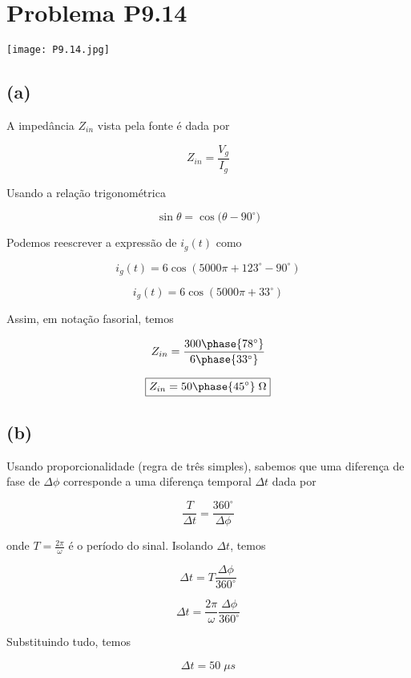 
\section*{Problema P9.14}

\renewcommand*\thesection{9.14}

\begin{center}
    \texttt{[image: P9.14.jpg]}
\end{center}

\subsection*{(a)}

A impedância \(Z_{in}\) vista pela fonte é dada por

\begin{equation}\label{eq:9.14.1}
    Z_{in} = \frac{V_g}{I_g}
\end{equation}

Usando a relação trigonométrica 

\[  \sin{\theta} = \cos({\theta - 90^{\circ})}  \]

Podemos reescrever a expressão de \(i_g(t)\) como

\[ i_g(t) = 6\cos({5000\pi + 123^{\circ} - 90^{\circ}})  \]

\[ i_g(t) = 6\cos({5000\pi + 33^{\circ}})  \]

Assim, em notação fasorial, temos 

\begin{equation}\label{eq:9.14.2}
    Z_{in} = \frac{300\phase{78^{\circ}}}{6\phase{33^{\circ}}}
\end{equation}

\[ \boxed{Z_{in} = 50\phase{45^{\circ}} \; \Omega}  \]

\subsection*{(b)}

Usando proporcionalidade (regra de três simples), sabemos que uma 
diferença de fase de \(\Delta \phi \) corresponde a uma diferença 
temporal \(\Delta t \) dada por    


\[ \frac{T}{\Delta t} = \frac{360^{\circ}}{\Delta \phi}  \]

onde \(T = \frac{2\pi}{\omega} \) é o período do sinal. Isolando \(\Delta t \), temos

\begin{equation}\label{eq:9.14.3}
    \Delta t = T \frac{\Delta \phi}{360^{\circ}}
\end{equation}

\[  \Delta t = \frac{2\pi}{\omega} \frac{\Delta \phi}{360^{\circ}}  \]

Substituindo tudo, temos

\[ \boxed{\Delta t = 50 \; \mu s}  \]
